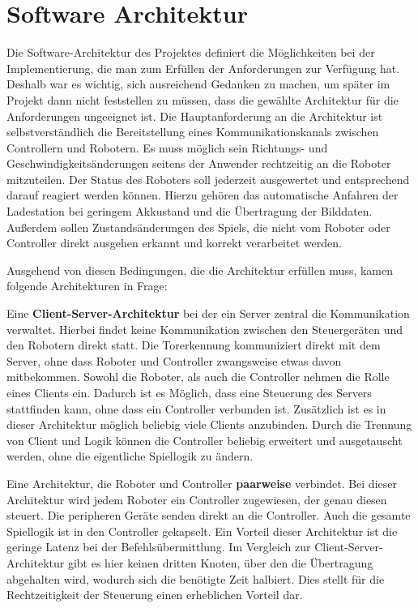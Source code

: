 \chapter{Software Architektur}
\label{sec:software-architektur}

Die Software-Architektur des Projektes definiert die Möglichkeiten bei der Implementierung, die man zum Erfüllen der Anforderungen zur Verfügung hat. Deshalb war es wichtig, sich ausreichend Gedanken zu machen, um später im Projekt dann nicht feststellen zu müssen, dass die gewählte Architektur für die Anforderungen ungeeignet ist. Die Hauptanforderung an die Architektur ist selbstverständlich die Bereitstellung eines Kommunikationskanals zwischen Controllern und Robotern. Es muss möglich sein Richtungs- und Geschwindigkeitsänderungen seitens der Anwender rechtzeitig an die Roboter mitzuteilen. Der Status des Roboters soll jederzeit ausgewertet und entsprechend darauf reagiert werden können. Hierzu gehören das automatische Anfahren der Ladestation bei geringem Akkustand und die Übertragung der Bilddaten. Außerdem sollen Zustandsänderungen des Spiels, die nicht vom Roboter oder Controller direkt ausgehen erkannt und korrekt verarbeitet werden. 

Ausgehend von diesen Bedingungen, die die Architektur erfüllen muss, kamen folgende Architekturen in Frage:

Eine \textbf{Client-Server-Architektur} bei der ein Server zentral die Kommunikation verwaltet. Hierbei findet keine Kommunikation zwischen den Steuergeräten und den Robotern direkt statt. Die Torerkennung kommuniziert direkt mit dem Server, ohne dass Roboter und Controller zwangsweise etwas davon mitbekommen. Sowohl die Roboter, als auch die Controller nehmen die Rolle eines Clients ein. Dadurch ist es Möglich, dass eine Steuerung des Servers stattfinden kann, ohne dass ein Controller verbunden ist. Zusätzlich ist es in dieser Architektur möglich beliebig viele Clients anzubinden. Durch die Trennung von Client und Logik können die Controller beliebig erweitert und ausgetauscht werden, ohne die eigentliche Spiellogik zu ändern.


Eine Architektur, die Roboter und Controller \textbf{paarweise} verbindet. Bei dieser Architektur wird jedem Roboter ein Controller zugewiesen, der genau diesen steuert. Die peripheren Geräte senden direkt an die Controller. Auch die gesamte Spiellogik ist in den Controller gekapselt. Ein Vorteil dieser Architektur ist die geringe Latenz bei der Befehlsübermittlung. Im Vergleich zur Client-Server-Architektur gibt es hier keinen dritten Knoten, über den die Übertragung abgehalten wird, wodurch sich die benötigte Zeit halbiert. Dies stellt für die Rechtzeitigkeit der Steuerung einen erheblichen Vorteil dar.


